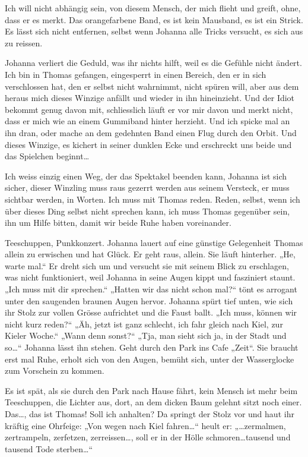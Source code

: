 \documentclass[10pt,titlepage,a5paper]{book}
\begin{document}
Ich will nicht abhängig sein, von diesem Mensch, der mich flieht und greift, ohne, dass er es merkt. Das orangefarbene Band, es ist kein Mausband, es ist ein Strick. Es lässt sich nicht entfernen, selbst wenn Johanna alle Tricks versucht, es sich aus zu reissen. 

Johanna verliert die Geduld, was ihr nichts hilft, weil es die Gefühle nicht ändert. Ich bin in Thomas gefangen, eingesperrt in einen Bereich, den er in sich verschlossen hat, den er selbst nicht wahrnimmt, nicht spüren will, aber aus dem heraus mich dieses Winzige anfällt und wieder in ihn hineinzieht. Und der Idiot bekommt genug davon mit, schliesslich läuft er vor mir davon und merkt nicht, dass er mich wie an einem Gummiband hinter herzieht. Und ich spicke mal an ihn dran, oder mache an dem gedehnten Band einen Flug durch den Orbit. Und dieses Winzige, es kichert in seiner dunklen Ecke und erschreckt uns beide und das Spielchen beginnt\dots 

Ich weiss einzig einen Weg, der das Spektakel beenden kann, Johanna ist sich sicher, dieser Winzling muss raus gezerrt werden aus seinem Versteck, er muss sichtbar werden, in Worten. Ich muss mit Thomas reden. Reden, selbst, wenn ich über dieses Ding selbst nicht sprechen kann, ich muss Thomas gegenüber sein, ihn um Hilfe bitten, damit wir beide Ruhe haben voreinander.

Teeschuppen, Punkkonzert. Johanna lauert auf eine günstige Gelegenheit Thomas allein zu erwischen und hat Glück. Er geht raus, allein. Sie läuft hinterher. „He, warte mal.“ Er dreht sich um und versucht sie mit seinem Blick zu erschlagen, was nicht funktioniert, weil Johanna in seine Augen kippt und fasziniert staunt. „Ich muss mit dir sprechen.“ „Hatten wir das nicht schon mal?“ tönt es arrogant unter den saugenden braunen Augen hervor. Johanna spürt tief unten, wie sich ihr Stolz zur vollen Grösse aufrichtet und die Faust ballt. „Ich muss, können wir nicht kurz reden?“ „Äh, jetzt ist ganz schlecht, ich fahr gleich nach Kiel, zur Kieler Woche.“ „Wann denn sonst?“ „Tja, man sieht sich ja, in der Stadt und so\dots “ Johanna lässt ihn stehen. Geht durch den Park ins Cafe „Zeit“. Sie braucht erst mal Ruhe, erholt sich von den Augen, bemüht sich, unter der Wasserglocke zum Vorschein zu kommen.

Es ist spät, als sie durch den Park nach Hause fährt, kein Mensch ist mehr beim Teeschuppen, die Lichter aus, dort, an dem dicken Baum gelehnt sitzt noch einer. Das\dots , das ist Thomas!  Soll ich anhalten? Da springt der Stolz vor und haut ihr kräftig eine Ohrfeige: „Von wegen nach Kiel fahren\dots “ heult er: „\dots  zermalmen, zertrampeln, zerfetzen, zerreissen\dots , soll er in der Hölle schmoren\dots  tausend und tausend Tode sterben\dots “
\end{document}
